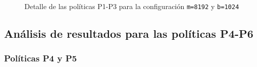 \begin{figure}
    \begin{subfigure}{0.75\textwidth}
      \centering
      \caption{\odroid}
    \end{subfigure}  
  \caption{Detalle de las políticas P1-P3 para la configuración
    \texttt{m=8192} y \texttt{b=1024}}
  \label{fig:detalle:p1-p4}
\end{figure}


\subsection{Análisis de resultados para las políticas P4-P6}

\subsubsection{Políticas P4 y P5}

